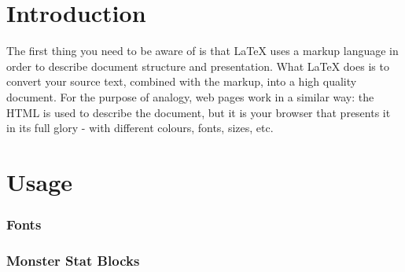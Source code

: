 \documentclass[a4paper]{module}
\begin{document}

\maketitle

\part{Introduction}

The first thing you need to be aware of is that LaTeX uses a markup language in order to describe document structure and presentation. What LaTeX does is to convert your source text, combined with the markup, into a high quality document. For the purpose of analogy, web pages work in a similar way: the HTML is used to describe the document, but it is your browser that presents it in its full glory - with different colours, fonts, sizes, etc.

\part{Usage}

%

\section{Fonts}


\section{Monster Stat Blocks}

\end{document}
